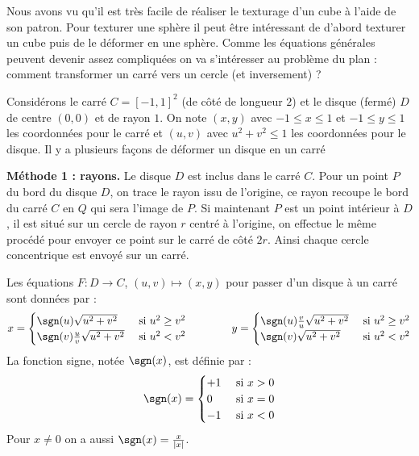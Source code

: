 \documentclass[11pt,class=report,crop=false]{standalone}
\begin{document}
Nous avons vu qu'il est très facile de réaliser le texturage d'un cube à l'aide de son patron.
Pour texturer une sphère il peut être intéressant de d'abord texturer un cube puis de le déformer en une sphère. Comme les équations générales peuvent devenir assez compliquées on va s'intéresser au problème du plan : comment transformer un carré vers un cercle (et inversement) ?

Considérons le carré $C = [-1,1]^2$ (de côté de longueur $2$) et le disque (fermé) $D$ de centre $(0,0)$ et de rayon $1$.
On note $(x,y)$ avec $-1 \le x \le 1$ et $-1 \le y \le 1$ les coordonnées pour le carré et $(u,v)$ avec $u^2+v^2 \le 1$ les coordonnées pour le disque. Il y a plusieurs façons de déformer un disque en un carré



\textbf{Méthode 1 : rayons.}
Le disque $D$ est inclus dans le carré $C$. Pour un point $P$ du bord du disque $D$, on trace le rayon issu de l'origine, ce rayon recoupe le bord du carré $C$ en $Q$ qui sera l'image de $P$. 
Si maintenant $P$ est un point intérieur à $D$, il est situé sur un cercle de rayon $r$ centré à l'origine, on effectue le même procédé pour envoyer ce point sur le carré de côté $2r$. Ainsi chaque cercle concentrique est envoyé sur un carré.


Les équations $F : D \to C$, $(u,v) \mapsto (x,y)$ pour passer d'un disque à un carré sont données par :
$$x = \begin{cases}
	\sgn(u) \sqrt{u^2+v^2} & \text{ si } u^2 \ge v^2 \\
	\sgn(v) \frac uv \sqrt{u^2+v^2} & \text{ si } u^2 < v^2 \\
\end{cases}
\qquad\qquad
y = \begin{cases}
	\sgn(u)\frac vu \sqrt{u^2+v^2} & \text{ si } u^2 \ge v^2 \\
	\sgn(v)\sqrt{u^2+v^2} & \text{ si } u^2 < v^2 \\
\end{cases}
$$
La fonction signe, notée $\sgn(x)$, est définie par :
$$\sgn(x) = \begin{cases}
	+1 & \text{ si } x > 0 \\
	0  &  \text{ si } x = 0 \\
	-1 & \text{ si } x < 0 \\
\end{cases}$$
Pour $x \neq 0$ on a aussi $\sgn(x) = \frac{x}{|x|}$.
\end{document}

